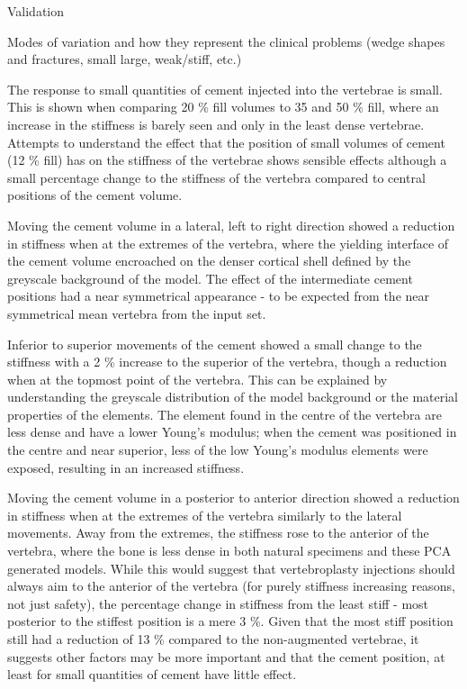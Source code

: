 Validation

Modes of variation and how they represent the clinical problems (wedge shapes and fractures, small large, weak/stiff, etc.)

	
The response to small quantities of cement injected into the vertebrae is small. This is shown when comparing 20 \% fill volumes to 35 and 50 \% fill, where an increase in the stiffness is barely seen and only in the least dense vertebrae.
Attempts to understand the effect that the position of small volumes of cement (12 \% fill) has on the stiffness of the vertebrae shows sensible effects although a small percentage change to the stiffness of the vertebra compared to central positions of the cement volume.



Moving the cement volume in a lateral, left to right direction showed a reduction in stiffness when at the extremes of the vertebra, where the yielding interface of the cement volume encroached on the denser cortical shell defined by the greyscale background of the model.
The effect of the intermediate cement positions had a near symmetrical appearance - to be expected from the near symmetrical mean vertebra from the input set.

Inferior to superior movements of the cement showed a small change to the stiffness with a 2 \% increase to the superior of the vertebra, though a reduction when at the topmost point of the vertebra.
This can be explained by understanding the greyscale distribution of the model background or the material properties of the elements.
The element found in the centre of the vertebra are less dense and have a lower Young's modulus; when the cement was positioned in the centre and near superior, less of the low Young's modulus elements were exposed, resulting in an increased stiffness.

Moving the cement volume in a posterior to anterior direction showed a reduction in stiffness when at the extremes of the vertebra similarly to the lateral movements.
Away from the extremes, the stiffness rose to the anterior of the vertebra, where the bone is less dense in both natural specimens and these PCA generated models.
While this would suggest that vertebroplasty injections should always aim to the anterior of the vertebra (for purely stiffness increasing reasons, not just safety), the percentage change in stiffness from the least stiff - most posterior to the stiffest position is a mere 3 \%.
Given that the most stiff position still had a reduction of 13 \% compared to the non-augmented vertebrae, it suggests other factors may be more important and that the cement position, at least for small quantities of cement have little effect.

